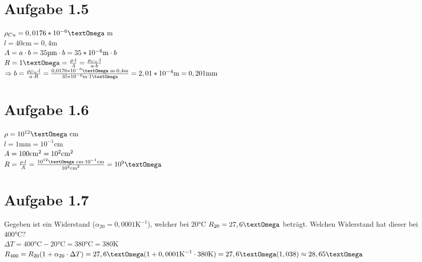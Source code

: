 \documentclass[]{article}
\newcommand{\unit}[1]{\text{#1}}
\newcommand{\textsq}[1]{\ensuremath{\text{#1}^2}}
\begin{document}
\section*{Aufgabe 1.5}
\par
	$\rho_{Cu} = 0,0176*10^{-6}\unit{\textOmega m}$\\
	$l = 40\unit{cm} = 0,4\unit{m}$\\
	$A = a \cdot b = 35\unit{\textmu m} \cdot b = 35*10^{-6}\unit{m} \cdot b$\\
	$R = 1\unit{\textOmega} = \frac{\rho \cdot l}{A} = \frac{\rho_{Cu} \cdot l}{a \cdot b}$\\
	$\Rightarrow b = \frac{\rho_{Cu} \cdot l}{a \cdot R} = \frac{0,0176*10^{-6}\unit{\textOmega m} \cdot 0,4\unit{m}}{35*10^{-6}\unit{m} \cdot 1\unit{\textOmega}} = 2,01*10^{-4}\unit{m} = 0,201\unit{mm}$\\

\section*{Aufgabe 1.6}
\par
	$\rho = 10^{12}\unit{\textOmega cm}$\\
	$l = 1\unit{mm} = 10^{-1}\unit{cm}$\\
	$A = 100\unit{\textsq{cm}}= 10^2\unit{\textsq{cm}}$\\
	$R = \frac{\rho \cdot l}{A} = \frac{10^{12}\unit{\textOmega cm} \cdot 10^{-1}\unit{cm}}{10^2\unit{\textsq{cm}}} = 10^{9}\unit{\textOmega}$

\section*{Aufgabe 1.7}
\par
	Gegeben ist ein Widerstand ($\alpha_{20} = 0,0001\unit{K}^{-1}$), welcher bei 20°C $R_{20} = 27,6\unit{\textOmega}$ beträgt. Welchen Widerstand hat dieser bei 400°C?\\
	$\Delta T = 400\unit{°C} - 20\unit{°C} = 380 \unit{°C} = 380 \unit{K}$\\
	$R_{400} = R_{20} (1 + \alpha_{20} \cdot \Delta T) = 27,6\unit{\textOmega}(1 + 0,0001\unit{K}^{-1} \cdot 380 \unit{K}) = 27,6\unit{\textOmega}(1,038) \approx 28,65\unit{\textOmega}$
\end{document}
